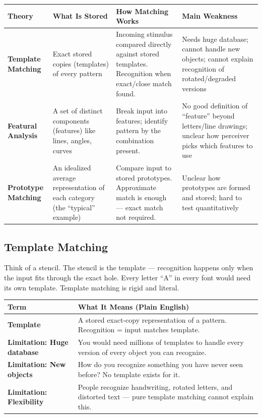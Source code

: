 \documentclass[11pt,a4paper]{article}
\newcommand{\bb}[1]{\textbf{#1}}
\begin{document}
\begin{center}
\renewcommand{\arraystretch}{1.4}
\begin{tabular}{|L{2.6cm}|L{3.5cm}|L{4.4cm}|L{4.7cm}|}
\hline
{}\color{white}\bb{Theory} & \color{white}\bb{What Is Stored} & \color{white}\bb{How Matching Works} & \color{white}\bb{Main Weakness} \\
\hline
\bb{Template Matching} & Exact stored copies (templates) of every pattern & Incoming stimulus compared directly against stored templates. Recognition when exact/close match found. & Needs huge database; cannot handle new objects; cannot explain recognition of rotated/degraded versions \\
\bb{Featural Analysis} & A set of distinct components (features) like lines, angles, curves & Break input into features; identify pattern by the combination present. & No good definition of ``feature'' beyond letters/line drawings; unclear how perceiver picks which features to use \\
\bb{Prototype Matching} & An idealized average representation of each category (the ``typical'' example) & Compare input to stored prototypes. Approximate match is enough --- exact match not required. & Unclear how prototypes are formed and stored; hard to test quantitatively \\
\hline
\end{tabular}
\end{center}
\newpage
\subsection*{Template Matching}

Think of a stencil. The stencil is the template --- recognition happens only when the input fits through the exact hole. Every letter ``A'' in every font would need its own template. Template matching is rigid and literal.

\begin{center}
\renewcommand{\arraystretch}{1.4}
\begin{tabular}{|L{3.2cm}|L{12cm}|}
\hline
{}\color{white}\bb{Term} & \color{white}\bb{What It Means (Plain English)} \\
\hline
\bb{Template} & A stored exact-copy representation of a pattern. Recognition = input matches template. \\
\bb{Limitation: Huge database} & You would need millions of templates to handle every version of every object you can recognize. \\
\bb{Limitation: New objects} & How do you recognize something you have never seen before? No template exists for it. \\
\bb{Limitation: Flexibility} & People recognize handwriting, rotated letters, and distorted text --- pure template matching cannot explain this. \\
\hline
\end{tabular}
\end{center}
\end{document}
